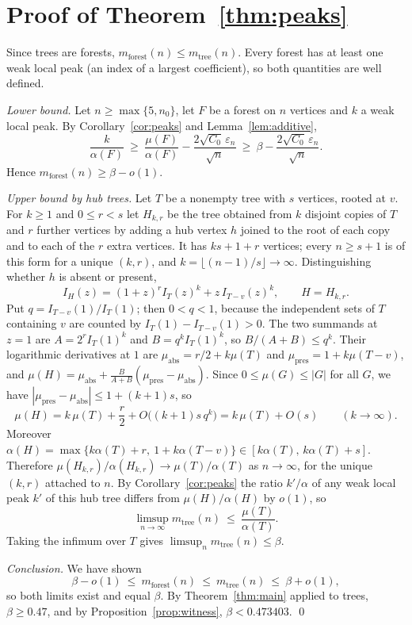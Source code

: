 \documentclass{amsart}
\numberwithin{equation}{section}
\theoremstyle{plain}
\theoremstyle{definition}
\theoremstyle{remark}
\newcommand{\eps}{\varepsilon}
\begin{document}
\section{Proof of Theorem~\ref{thm:peaks}}\label{sec:proof}

Since trees are forests, $m_{\mathrm{forest}}(n)\le m_{\mathrm{tree}}(n)$. Every forest has at least one weak local peak (an index of a largest coefficient), so both quantities are well defined.

\emph{Lower bound.} Let $n\ge\max\{5,n_0\}$, let $F$ be a forest on $n$ vertices and $k$ a weak local peak. By Corollary~\ref{cor:peaks} and Lemma~\ref{lem:additive},
\[
\frac{k}{\alpha(F)}\ \ge\ \frac{\mu(F)}{\alpha(F)}-\frac{2\sqrt{C_0}\,\eps_n}{\sqrt n}\ \ge\ \beta-\frac{2\sqrt{C_0}\,\eps_n}{\sqrt n}.
\]
Hence $m_{\mathrm{forest}}(n)\ge\beta-o(1)$.

\emph{Upper bound by hub trees.} Let $T$ be a nonempty tree with $s$ vertices, rooted at $v$. For $k\ge1$ and $0\le r<s$ let $H_{k,r}$ be the tree obtained from $k$ disjoint copies of $T$ and $r$ further vertices by adding a hub vertex $h$ joined to the root of each copy and to each of the $r$ extra vertices. It has $ks+1+r$ vertices; every $n\ge s+1$ is of this form for a unique $(k,r)$, and $k=\lfloor(n-1)/s\rfloor\to\infty$. Distinguishing whether $h$ is absent or present,
\[
I_H(z)=(1+z)^rI_T(z)^k+z\,I_{T-v}(z)^k,\qquad H=H_{k,r}.
\]
Put $q=I_{T-v}(1)/I_T(1)$; then $0<q<1$, because the independent sets of $T$ containing $v$ are counted by $I_T(1)-I_{T-v}(1)>0$. The two summands at $z=1$ are $A=2^rI_T(1)^k$ and $B=q^kI_T(1)^k$, so $B/(A+B)\le q^k$. Their logarithmic derivatives at $1$ are $\mu_{\mathrm{abs}}=r/2+k\mu(T)$ and $\mu_{\mathrm{pres}}=1+k\mu(T-v)$, and $\mu(H)=\mu_{\mathrm{abs}}+\frac{B}{A+B}(\mu_{\mathrm{pres}}-\mu_{\mathrm{abs}})$. Since $0\le\mu(G)\le|G|$ for all $G$, we have $|\mu_{\mathrm{pres}}-\mu_{\mathrm{abs}}|\le1+(k+1)s$, so
\[
\mu(H)=k\,\mu(T)+\frac r2+O\bigl((k+1)s\,q^k\bigr)=k\,\mu(T)+O(s)\qquad(k\to\infty).
\]
Moreover $\alpha(H)=\max\{k\alpha(T)+r,\ 1+k\alpha(T-v)\}\in[k\alpha(T),\,k\alpha(T)+s]$. Therefore $\mu(H_{k,r})/\alpha(H_{k,r})\to\mu(T)/\alpha(T)$ as $n\to\infty$, for the unique $(k,r)$ attached to $n$. By Corollary~\ref{cor:peaks} the ratio $k'/\alpha$ of any weak local peak $k'$ of this hub tree differs from $\mu(H)/\alpha(H)$ by $o(1)$, so
\[
\limsup_{n\to\infty}m_{\mathrm{tree}}(n)\ \le\ \frac{\mu(T)}{\alpha(T)}.
\]
Taking the infimum over $T$ gives $\limsup_nm_{\mathrm{tree}}(n)\le\beta$.

\emph{Conclusion.} We have shown
\[
\beta-o(1)\ \le\ m_{\mathrm{forest}}(n)\ \le\ m_{\mathrm{tree}}(n)\ \le\ \beta+o(1),
\]
so both limits exist and equal $\beta$. By Theorem~\ref{thm:main} applied to trees, $\beta\ge0.47$, and by Proposition~\ref{prop:witness}, $\beta<0.473403$. \qed
\end{document}

